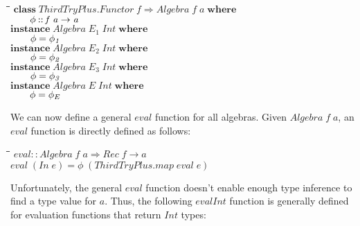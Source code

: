 \documentclass[10pt]{article}
\newlength{\lwidth}\setlength{\lwidth}{4.5cm}
\newlength{\cwidth}\setlength{\cwidth}{8mm} %
\newcommand{\Conid}[1]{\mathit{#1}}
\newcommand{\Varid}[1]{\mathit{#1}}
\begin{document}
\begin{tabbing}
\qquad\=\hspace{\lwidth}\=\hspace{\cwidth}\=\+\kill
${\mathbf{class}\;\Conid{\Conid{ThirdTryPlus}.Functor}\;\Varid{f}\Rightarrow \Conid{Algebra}\;\Varid{f}\;\Varid{a}\;\mathbf{where}}$\\
${\hskip2.00em\relax\Varid{\phi}\mathbin{::}\Varid{f}\;\Varid{a}\to \Varid{a}}$\\
${}$\\
${\mathbf{instance}\;\Conid{Algebra}\;\Varid{E}_1\;\Conid{Int}\;\mathbf{where}}$\\
${\hskip2.00em\relax\Varid{\phi}\mathrel{=}\Varid{\phi_1}}$\\
${}$\\
${\mathbf{instance}\;\Conid{Algebra}\;\Varid{E}_2\;\Conid{Int}\;\mathbf{where}}$\\
${\hskip2.00em\relax\Varid{\phi}\mathrel{=}\Varid{\phi_2}}$\\
${}$\\
${\mathbf{instance}\;\Conid{Algebra}\;\Varid{E}_3\;\Conid{Int}\;\mathbf{where}}$\\
${\hskip2.00em\relax\Varid{\phi}\mathrel{=}\Varid{\phi_3}}$\\
${}$\\
${\mathbf{instance}\;\Conid{Algebra}\;\Conid{E}\;\Conid{Int}\;\mathbf{where}}$\\
${\hskip2.00em\relax\Varid{\phi}\mathrel{=}\Varid{\phi}_E}$
\end{tabbing}
We can now define a general \ensuremath{\Varid{eval}} function for all algebras.  Given
\ensuremath{\Conid{Algebra}\;\Varid{f}\;\Varid{a}}, an \ensuremath{\Varid{eval}} function is directly defined as follows:

\begin{tabbing}
\qquad\=\hspace{\lwidth}\=\hspace{\cwidth}\=\+\kill
${\Varid{eval}\mathbin{::}\Conid{Algebra}\;\Varid{f}\;\Varid{a}\Rightarrow \Conid{Rec}\;\Varid{f}\to \Varid{a}}$\\
${\Varid{eval}\;(\Conid{In}\;\Varid{e})\mathrel{=}\Varid{\phi}\;(\Varid{\Conid{ThirdTryPlus}.map}\;\Varid{eval}\;\Varid{e})}$
\end{tabbing}
Unfortunately, the general \ensuremath{\Varid{eval}} function doesn't enable enough type
inference to find a type value for \ensuremath{\Varid{a}}.  Thus, the following \ensuremath{\Varid{evalInt}}
function is generally defined for evaluation functions that return
\ensuremath{\Conid{Int}} types:
\end{document}
